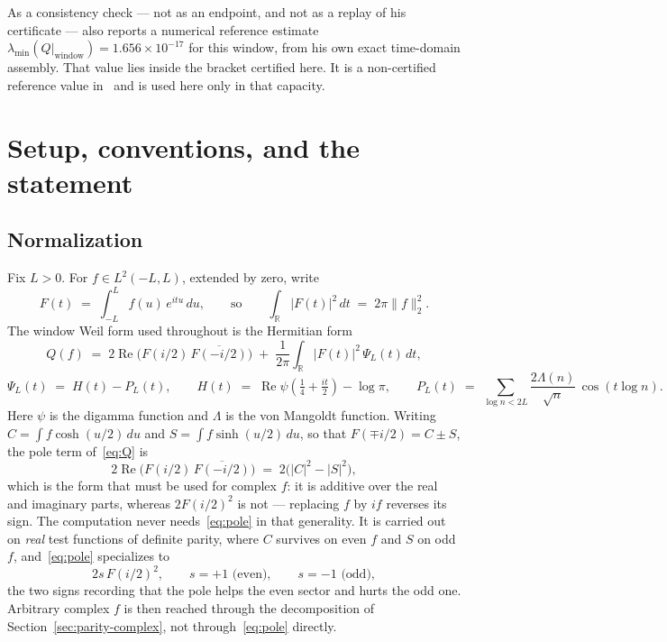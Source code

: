 \documentclass[11pt,a4paper]{article}
\theoremstyle{definition}
\theoremstyle{remark}
\newcommand{\PsiL}{\Psi_{L}}
\begin{document}
As a consistency check --- not as an endpoint, and not as a replay of his
certificate --- \cite{Zhu} also reports a numerical reference estimate
$\lambda_{\min}(Q|_{\text{window}}) = 1.656\times10^{-17}$ for this window, from
his own exact time-domain assembly. That value lies inside the bracket certified
here. It is a non-certified reference value in~\cite{Zhu} and is used here only
in that capacity.

\section{Setup, conventions, and the statement}
\label{sec:setup}

\subsection{Normalization}

Fix $L > 0$. For $f \in L^2(-L,L)$, extended by zero, write
\[
   F(t) \;=\; \int_{-L}^{L} f(u)\, e^{itu}\, du ,
   \qquad\text{so}\qquad
   \int_{\mathbb{R}} |F(t)|^2\, dt \;=\; 2\pi \|f\|_2^2 .
\]
The window Weil form used throughout is the Hermitian form
\begin{equation}
\label{eq:Q}
   Q(f) \;=\; 2\operatorname{Re}\!\big(F(i/2)\,\overline{F(-i/2)}\big)
     \;+\; \frac{1}{2\pi}\int_{\mathbb{R}} |F(t)|^2\, \PsiL(t)\, dt ,
\end{equation}
\begin{equation}
\label{eq:Psi}
   \PsiL(t) \;=\; H(t) - P_L(t), \qquad
   H(t) \;=\; \operatorname{Re}\psi\!\left(\tfrac14 + \tfrac{it}{2}\right) - \log\pi ,
   \qquad
   P_L(t) \;=\; \sum_{\log n < 2L} \frac{2\Lambda(n)}{\sqrt n}\,\cos(t \log n) .
\end{equation}
Here $\psi$ is the digamma function and $\Lambda$ is the von Mangoldt function.
Writing $C = \int f\cosh(u/2)\,du$ and $S = \int f\sinh(u/2)\,du$, so that
$F(\mp i/2) = C \pm S$, the pole term of~\eqref{eq:Q} is
\begin{equation}
\label{eq:pole}
   2\operatorname{Re}\!\big(F(i/2)\,\overline{F(-i/2)}\big)
   \;=\; 2\big(|C|^2 - |S|^2\big) ,
\end{equation}
which is the form that must be used for complex $f$: it is additive over the
real and imaginary parts, whereas $2F(i/2)^2$ is not --- replacing $f$ by $if$
reverses its sign. The computation never needs~\eqref{eq:pole} in that
generality. It is carried out on \emph{real} test functions of definite parity,
where $C$ survives on even $f$ and $S$ on odd $f$, and~\eqref{eq:pole}
specializes to
\[
   2 s\, F(i/2)^2 , \qquad s = +1 \text{ (even)}, \qquad s = -1 \text{ (odd)} ,
\]
the two signs recording that the pole helps the even sector and hurts the odd
one. Arbitrary complex $f$ is then reached through the decomposition of
Section~\ref{sec:parity-complex}, not through~\eqref{eq:pole} directly.
\end{document}
